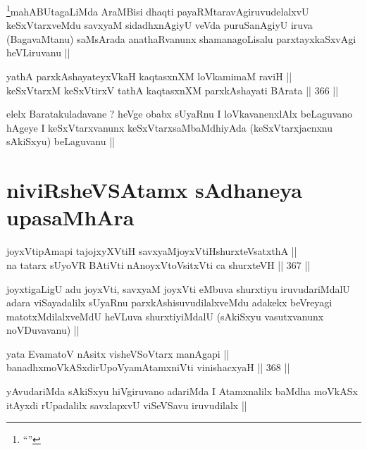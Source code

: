 \begin{artha}
\footnote{``\stext''}mahABUtagaLiMda AraMBisi dhaqti payaRMtaravAgiruvudelalxvU
keSxVtarxveMdu savxyaM sidadhxnAgiyU veVda puruSanAgiyU iruva
(BagavaMtanu) saMsArada anathaRvanunx shamanagoLisalu parxtayxkaSxvAgi
heVLiruvanu ||
\end{artha}


\begin{shl}
yathA parxkAshayateyxVkaH kaqtasxnXM loVkamimaM raviH || \\
keSxVtarxM keSxVtirxV tathA kaqtasxnXM parxkAshayati BArata ||  366 ||  
\end{shl}

\begin{artha}
elelx Baratakuladavane ? heVge obabx sUyaRnu I loVkavanenxlAlx
beLaguvano hAgeye I keSxVtarxvanunx keSxVtarxsaMbaMdhiyAda
(keSxVtarxjacnxnu sAkiSxyu) beLaguvanu ||
\end{artha}

\section*{niviRsheVSAtamx sAdhaneya upasaMhAra}


\begin{shl}
joyxVtipAmapi tajojxyXVtiH savxyaMjoyxVtiHshurxteVsatxthA || \\
na tatarx sUyoVR BAtiVti nAnoyxV\s toV\s sitxVti ca shurxteVH ||  367 ||  
\end{shl}

\begin{artha}
joyxtigaLigU adu joyxVti, savxyaM joyxVti eMbuva shurxtiyu
iruvudariMdalU adara viSayadalilx sUyaRnu parxkAshisuvudilalxveMdu
adakekx beVreyagi matotxMdilalxveMdU heVLuva shurxtiyiMdalU (sAkiSxyu
vasutxvanunx noVDuvavanu) ||
\end{artha}


\begin{shl}
yata EvamatoV nAsitx visheVSoV\s tarx manAgapi || \\
banadhxmoVkASxdirUpoV\s yamAtamxniVti vinishacxyaH ||  368 ||  
\end{shl}

\begin{artha}
yAvudariMda sAkiSxyu hiVgiruvano adariMda I Atamxnalilx baMdha moVkASx
itAyxdi rUpadalilx savxlapxvU viSeVSavu iruvudilalx ||
\end{artha}

